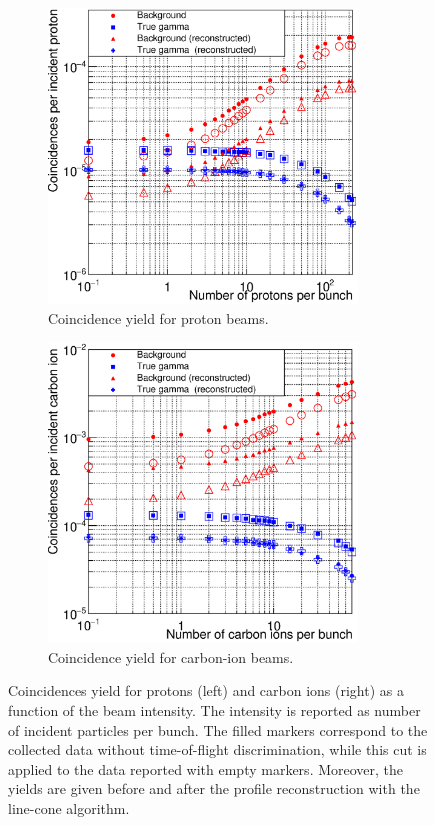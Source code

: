 \begin{figure} [!h]
 \begin{subfigure}[t]{.49\textwidth}
 \includegraphics[width=0.9\textwidth]{03_GraphicFiles/chapter4_HTsimu/new/coincYields_protons.eps}
 \caption{Coincidence yield for proton beams.}
\label{chap4::fig::coincidences_p}
\end{subfigure}
\begin{subfigure}[t]{.49\textwidth}
\includegraphics[width=0.9\textwidth]{03_GraphicFiles/chapter4_HTsimu/new/coincYields_Cions.eps}
\caption{Coincidence yield for carbon-ion beams.}
\label{chap4::fig::coincidences_C}
\end{subfigure}
  \caption{Coincidences yield for protons (left) and carbon ions (right) as a function of the beam intensity. The intensity is reported as number of incident particles per bunch. The filled markers correspond to the collected data without time-of-flight discrimination, while this cut is applied to the data reported with empty markers. Moreover, the yields are given before and after the profile reconstruction with the line-cone algorithm.}
  \label{chap4::fig::coincidences}
\end{figure}

